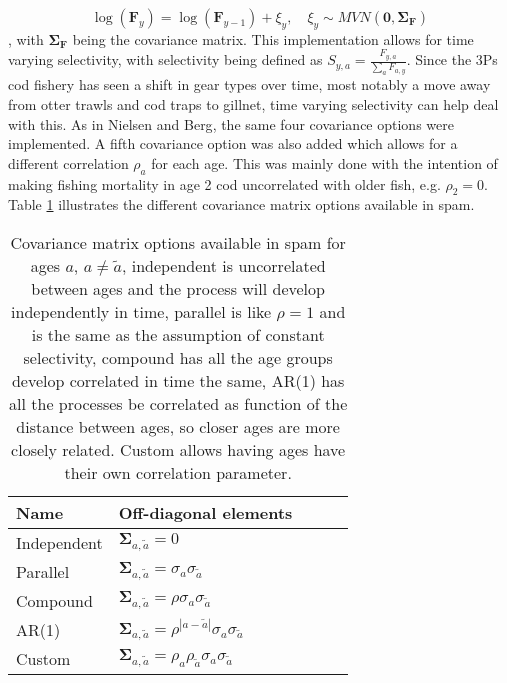 \documentclass[11pt]{article}\usepackage[]{graphicx}\usepackage[]{color}
\begin{document}
\begin{equation}
	\log(\bm{F}_y) = \log(\bm{F}_{y-1}) + \xi_y, \quad \xi_y \sim MVN(\bm{0},\bm{\Sigma_F})
\end{equation}, with $\bm{\Sigma_F}$ being the covariance matrix. This implementation allows for time varying selectivity, with selectivity being defined as $S_{y,a} = \frac{F_{y,a}}{\sum_{a}F_{a,y}}$\cite{Nielsen2014Estimation-of-t}. Since the 3Ps cod fishery has seen a shift in gear types over time, most notably a move away from otter trawls and cod traps to gillnet, time varying selectivity can help deal with this. As in Nielsen and Berg\cite{Nielsen2014Estimation-of-t}, the same four covariance options were implemented. A fifth covariance option was also added which allows for a different correlation $\rho_a$ for each age. This was mainly done with the intention of making fishing mortality in age 2 cod uncorrelated with older fish, e.g. $\rho_2=0$. Table \ref{sigTab} illustrates the different covariance matrix options available in \acrshort{spam}.

\begin{table}[]
\begin{tabular}{lllll}
Name & Off-diagonal elements &\\ \hline
Independent & $\bm{\Sigma}_{a,\tilde a} = 0$ &\\
Parallel    & $\bm{\Sigma}_{a,\tilde a} = \sigma_a\sigma_{\tilde a}$                             &\\
Compound    & $\bm{\Sigma}_{a,\tilde a} = \rho\sigma_a\sigma_{\tilde a}$                              &\\
AR(1)       & $\bm{\Sigma}_{a,\tilde a} = \rho^{|a-\tilde a|}\sigma_a\sigma_{\tilde a}$                            & \\
Custom      & $\bm{\Sigma}_{a,\tilde a} = \rho_a\rho_{\tilde a}\sigma_a\sigma_{\tilde a}$                             & 
\end{tabular}
\caption{Covariance matrix options available in \acrshort{spam} for ages $a$, $a \neq \tilde a$, independent is uncorrelated between ages and the process will develop independently in time, parallel is like $\rho=1$ and is the same as the assumption of constant selectivity, compound has all the age groups develop correlated in time the same, AR(1) has all the processes be correlated as function of the distance between ages, so closer ages are more closely related. Custom allows having ages have their own correlation parameter.}
\label{sigTab} 
\end{table} 
\end{document}
